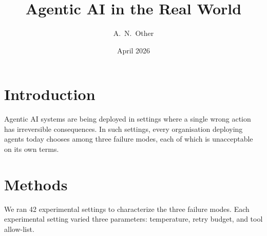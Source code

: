 \documentclass[11pt]{article}
\title{Agentic AI in the Real World}
\author{A.\ N.\ Other}
\date{April 2026}
\begin{document}
\maketitle

\section{Introduction}

Agentic AI systems are being deployed in settings where a single wrong action has irreversible consequences.
In such settings, every organisation deploying agents today chooses among three failure modes, each of which is unacceptable on its own terms.

\section{Methods}

We ran 42 experimental settings to characterize the three failure modes.
Each experimental setting varied three parameters: temperature, retry budget, and tool allow-list.
\end{document}

